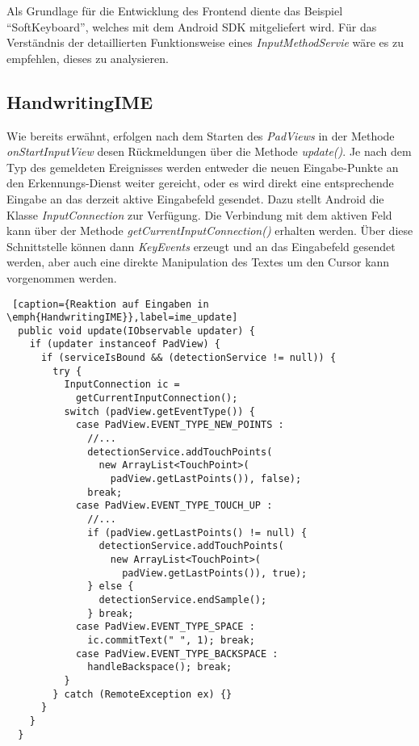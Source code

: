 Als Grundlage für die Entwicklung des Frontend diente das Beispiel ``SoftKeyboard'', welches mit dem Android SDK mitgeliefert wird. Für das Verständnis der detaillierten Funktionsweise eines \emph{InputMethodServie} wäre es zu empfehlen, dieses zu analysieren.

\subsection{HandwritingIME}

Wie bereits erwähnt, erfolgen nach dem Starten des \emph{PadViews} in der Methode \emph{onStartInputView} desen Rückmeldungen über die Methode \emph{update()}. Je nach dem Typ des gemeldeten Ereignisses werden entweder die neuen Eingabe-Punkte an den Erkennungs-Dienst weiter gereicht, oder es wird direkt eine entsprechende Eingabe an das derzeit aktive Eingabefeld gesendet. Dazu stellt Android die Klasse \emph{InputConnection} zur Verfügung. Die Verbindung mit dem aktiven Feld kann über der Methode \emph{getCurrentInputConnection()} erhalten werden. Über diese Schnittstelle können dann \emph{KeyEvents} erzeugt und an das Eingabefeld gesendet werden, aber auch eine direkte Manipulation des Textes um den Cursor kann vorgenommen werden.


\begin{lstlisting} [caption={Reaktion auf Eingaben in \emph{HandwritingIME}},label=ime_update]
  public void update(IObservable updater) {
    if (updater instanceof PadView) {
      if (serviceIsBound && (detectionService != null)) {
        try {
          InputConnection ic = 
            getCurrentInputConnection();
          switch (padView.getEventType()) {
            case PadView.EVENT_TYPE_NEW_POINTS :
              //...
              detectionService.addTouchPoints(
                new ArrayList<TouchPoint>(
                  padView.getLastPoints()), false);
              break;
            case PadView.EVENT_TYPE_TOUCH_UP :
              //...
              if (padView.getLastPoints() != null) {
                detectionService.addTouchPoints(
                  new ArrayList<TouchPoint>(
                    padView.getLastPoints()), true);
              } else {
                detectionService.endSample();
              } break;
            case PadView.EVENT_TYPE_SPACE :
              ic.commitText(" ", 1); break;
            case PadView.EVENT_TYPE_BACKSPACE :
              handleBackspace(); break;
          }
        } catch (RemoteException ex) {}
      }
    }
  }
\end{lstlisting}

